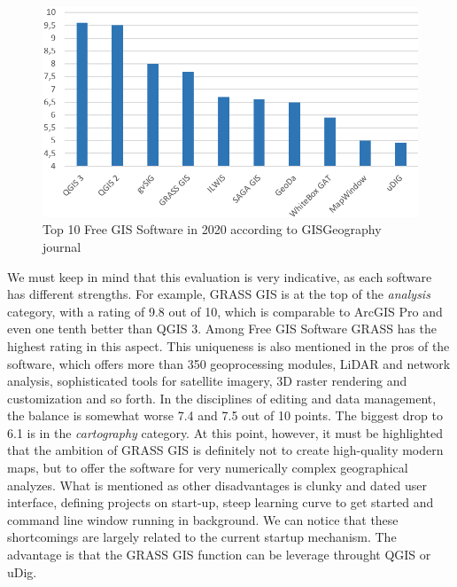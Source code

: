 \documentclass[a4paper,10pt,twoside]{article}
\begin{document}
\vspace{0.3cm}
\begin{figure}[hbt!] 
\begin{center}
\includegraphics[width=13cm]{pictures/hodnoceni_free.png} 
\caption[Top 10 Free GIS Software in 2020 according to GISGeography journal]{Top 10 Free GIS Software in 2020 according to GISGeography journal}
\label{fig:hodnoceni_free}
\end{center}
\end{figure}

We must keep in mind that this evaluation is very indicative, as each software has different strengths. For example, GRASS GIS is at the top of the \textit{analysis} category, with a rating of 9.8 out of 10, which is comparable to ArcGIS Pro and even one tenth better than QGIS 3. Among Free GIS Software GRASS has the highest rating in this aspect. This uniqueness is also mentioned in the pros of the software, which offers more than 350 geoprocessing modules, LiDAR and network analysis, sophisticated tools for satellite imagery, 3D raster rendering and customization and so forth. In the disciplines of editing and data management, the balance is somewhat worse 7.4 and 7.5 out of 10 points. The biggest drop to 6.1 is in the \textit{cartography} category. At this point, however, it must be highlighted that the ambition of GRASS GIS is definitely not to create high-quality modern maps, but to offer the software for very numerically complex geographical analyzes. What is mentioned as other disadvantages is clunky and dated user interface, defining projects on start-up, steep learning curve to get started and command line window running in background. We can notice that these shortcomings are largely related to the current startup mechanism. The advantage is that the GRASS GIS function can be leverage throught QGIS or uDig.\\
\end{document}
